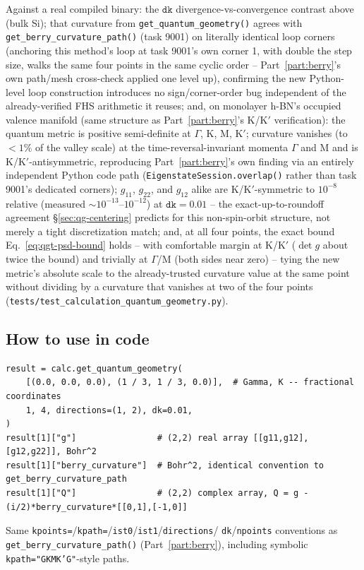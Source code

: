 \documentclass[11pt]{article}
\begin{document}
Against a real compiled binary: the $\texttt{dk}$ divergence-vs-convergence contrast
above (bulk Si); that curvature from \texttt{get\_quantum\_geometry()} agrees with
\texttt{get\_berry\_curvature\_path()} (task 9001) on literally identical loop corners
(anchoring this method's loop at task 9001's own corner 1, with double the step size,
walks the same four points in the same cyclic order -- Part~\ref{part:berry}'s own
path/mesh cross-check applied one level up), confirming the new Python-level loop
construction introduces no sign/corner-order bug independent of the already-verified FHS
arithmetic it reuses; and, on monolayer h-BN's occupied valence manifold (same structure
as Part~\ref{part:berry}'s K/K$'$ verification): the quantum metric is positive
semi-definite at $\Gamma$, K, M, K$'$; curvature vanishes (to $<1\%$ of the valley scale)
at the time-reversal-invariant momenta $\Gamma$ and M and is K/K$'$-antisymmetric,
reproducing Part~\ref{part:berry}'s own finding via an entirely independent Python code
path (\texttt{EigenstateSession.overlap()} rather than task 9001's dedicated corners);
$g_{11}$, $g_{22}$, and $g_{12}$ alike are K/K$'$-symmetric to $10^{-8}$ relative (measured
$\sim10^{-13}$--$10^{-12}$) at $\texttt{dk}=0.01$ -- the exact-up-to-roundoff agreement
\S\ref{sec:qg-centering} predicts for this non-spin-orbit structure, not merely a tight
discretization match; and, at all four
points, the exact bound Eq.~\eqref{eq:qgt-psd-bound} holds -- with comfortable margin at
K/K$'$ ($\det g$ about twice the bound) and trivially at $\Gamma$/M (both sides
near zero) -- tying the new metric's absolute scale to the already-trusted curvature
value at the same point without dividing by a curvature that vanishes at two of the four
points (\texttt{tests/test\_calculation\_quantum\_geometry.py}).

\subsection{How to use in code}

\begin{verbatim}
result = calc.get_quantum_geometry(
    [(0.0, 0.0, 0.0), (1 / 3, 1 / 3, 0.0)],  # Gamma, K -- fractional coordinates
    1, 4, directions=(1, 2), dk=0.01,
)
result[1]["g"]                # (2,2) real array [[g11,g12],[g12,g22]], Bohr^2
result[1]["berry_curvature"]  # Bohr^2, identical convention to get_berry_curvature_path
result[1]["Q"]                # (2,2) complex array, Q = g - (i/2)*berry_curvature*[[0,1],[-1,0]]
\end{verbatim}
Same \texttt{kpoints=}/\texttt{kpath=}/\texttt{ist0}/\texttt{ist1}/\texttt{directions}/
\texttt{dk}/\texttt{npoints} conventions as \texttt{get\_berry\_curvature\_path()}
(Part~\ref{part:berry}), including symbolic \texttt{kpath="GKMK'G"}-style paths.
\end{document}

